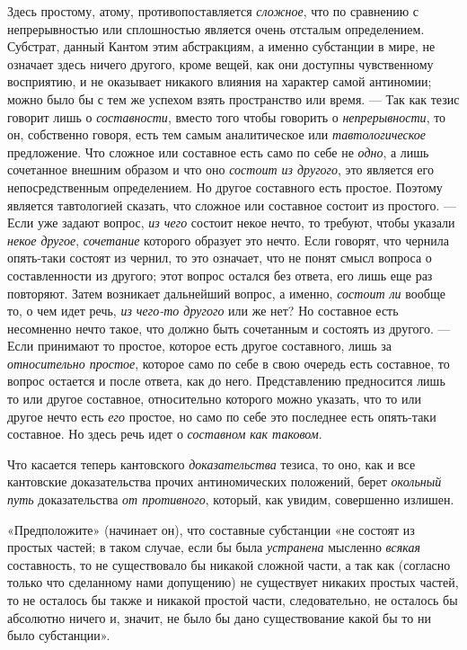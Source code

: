 Здесь простому, атому, противопоставляется
{\em сложное}, что по сравнению с непрерывностью или
сплошностью является очень отсталым определением. Субстрат, данный Кантом
этим абстракциям, а именно субстанции в мире, не означает здесь ничего
другого, кроме вещей, как они доступны чувственному восприятию, и не
оказывает никакого влияния на характер самой антиномии; можно было бы с тем
же успехом взять пространство или время. — Так как тезис говорит лишь о
{\em составности}, вместо того чтобы говорить о
{\em непрерывности}, то он, собственно говоря, есть тем
самым аналитическое или {\em тавтологическое}
предложение. Что сложное или составное есть само по себе не
{\em одно}, а лишь сочетанное внешним образом и что оно
{\em состоит из другого}, это является его
непосредственным определением. Но другое составного есть простое. Поэтому
является тавтологией сказать, что сложное или составное состоит из
простого. — Если уже задают вопрос, {\em из чего}
состоит некое нечто, то требуют, чтобы указали
{\em некое другое}, {\em сочетание}
которого образует это нечто. Если говорят, что чернила опять-таки состоят
из чернил, то это означает, что не понят смысл вопроса о составленности из
другого; этот вопрос остался без ответа, его лишь еще раз повторяют. Затем
возникает дальнейший вопрос, а именно, {\em состоит ли}
вообще то, о чем идет речь, {\em из чего-то другого}
или же нет? Но составное есть несомненно нечто такое, что должно быть
сочетанным и состоять из другого. — Если принимают то простое, которое есть
другое составного, лишь за {\em относительно простое},
которое само по себе в свою очередь есть составное, то вопрос остается и
после ответа, как до него. Представлению предносится лишь то или другое
составное, относительно которого можно указать, что то или другое нечто
есть {\em его} простое, но само по себе это последнее
есть опять-таки составное. Но здесь речь идет о
{\em составном как таковом}.

Что касается теперь кантовского {\em доказательства}
тезиса, то оно, как и все кантовские доказательства прочих антиномических
положений, берет {\em окольный путь} доказательства
{\em от противного}, который, как увидим, совершенно
излишен.

«Предположите» (начинает он), что составные субстанции «не состоят из
простых частей; в таком случае, если бы была
{\em устранена} мысленно
{\em всякая} составность, то не существовало бы никакой
сложной части, а так как (согласно только что сделанному нами допущению) не
существует никаких простых частей, то не осталось бы также и никакой
простой части, следовательно, не осталось бы абсолютно ничего и, значит, не
было бы дано существование какой бы то ни было субстанции».

